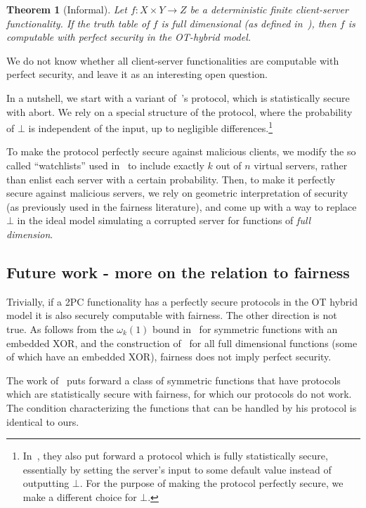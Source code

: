 \documentclass[a4paper]{article}
\newtheorem{theorem}{Theorem}[section]
\begin{document}
\begin{theorem}[Informal]
	Let $f:X\times Y\rightarrow Z$ be a deterministic finite client-server functionality. If the truth table of $f$ is full dimensional (as defined in~\cite{Ash14}), then $f$ is computable with perfect security in the OT-hybrid model.
\end{theorem}

We do not know whether all client-server functionalities are computable with perfect security, and leave it as an interesting open question.

In a nutshell, we start with a variant of~\cite{IKOPS11}'s protocol, which is statistically secure with abort. We rely on a special structure of the protocol, where the probability of $\bot$ is independent of the input, up to negligible differences.\footnote{In~\cite{IKOPS11},
they also put forward a protocol which is fully statistically secure, essentially by setting the server's input to some default value instead of outputting $\bot$. For the purpose of making the protocol perfectly secure, we make a different choice for $\bot$.}

To make the protocol perfectly secure against malicious clients, we modify the so called ``watchlists'' used in~\cite{IKOPS11}  to include exactly $k$ out of $n$ virtual servers, rather than enlist each server with a certain probability. Then, to make it perfectly secure against malicious servers, we rely on geometric interpretation of security (as previously used in the fairness literature), and come up with a way to replace $\bot$ in the ideal model simulating a corrupted server for functions of \emph{full dimension}.

\subsection{Future work - more on the relation to fairness}

Trivially, if a 2PC functionality has a perfectly secure protocols in the OT hybrid model it is also securely computable with fairness.
The other direction is not true. As follows from the $\omega_k(1)$ bound in~\cite{GHKL08} for symmetric functions with an embedded XOR, and the  construction of~\cite{Ash14} for all full dimensional functions (some of which have an embedded XOR), fairness does not imply perfect security. 

The work of~\cite{Ash14} puts forward a class of symmetric functions that have protocols which are statistically secure with fairness, for which our protocols do not work. The condition characterizing the functions that can be handled by his protocol is identical to ours. 
\end{document}
